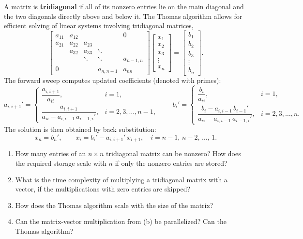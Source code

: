 \begin{exercise}\label{ex:thomas-algorithm} %
  A matrix is \textbf{tridiagonal} if all of its nonzero entries lie on the main diagonal and the two diagonals directly above and below it.
  The Thomas algorithm allows for efficient solving of linear systems involving tridiagonal matrices,
  \[
    \begin{bmatrix}
    a_{11} & a_{12}  &         &            & 0      \\
    a_{21} & a_{22}  & a_{23}  &            &        \\
           & a_{32}  & a_{33}  & \ddots     &        \\
           &         & \ddots  & \ddots     & a_{n-1,n}\\
    0      &         &         & a_{n,n-1}  & a_{nn}
    \end{bmatrix}
    \begin{bmatrix} x_1 \\ x_2 \\ x_3 \\ \vdots \\ x_n \end{bmatrix}
    =
    \begin{bmatrix} b_1 \\ b_2 \\ b_3 \\ \vdots \\ b_n \end{bmatrix}.
  \]
  The forward sweep computes updated coefficients (denoted with primes):
  \[
    a_{i,i+1}' =
    \begin{cases}
    \dfrac{a_{i,i+1}}{a_{ii}}, & i = 1,\\[2.5ex]
    \dfrac{a_{i,i+1}}{a_{ii} - a_{i,i-1}\, a_{i-1,i}'}, & i = 2,3,\dots,n-1,
    \end{cases}
    \qquad
    b_i' =
    \begin{cases}
    \dfrac{b_i}{a_{ii}}, & i = 1,\\[2.5ex]
    \dfrac{b_i - a_{i,i-1}\, b_{i-1}'}{a_{ii} - a_{i,i-1}\, a_{i-1,i}'}, & i = 2,3,\dots,n.
    \end{cases}
  \]
  The solution is then obtained by back substitution:
  \[
    x_n = b_n', \qquad x_i = b_i' - a_{i,i+1}'\, x_{i+1}, \quad i = n-1,\, n-2,\,\dots,\,1.
  \]
  \begin{enumerate}[label=(\alph*)]
      \item How many entries of an $n \times n$ tridiagonal matrix can be nonzero? How does the required storage scale with $n$ if only the nonzero entries are stored?
      \item What is the time complexity of multiplying a tridiagonal matrix with a vector, if the multiplications with zero entries are skipped?
      \item How does the Thomas algorithm scale with the size of the matrix?
      \item Can the matrix-vector multiplication from (b) be parallelized? Can the Thomas algorithm?
  \end{enumerate}
\end{exercise}

